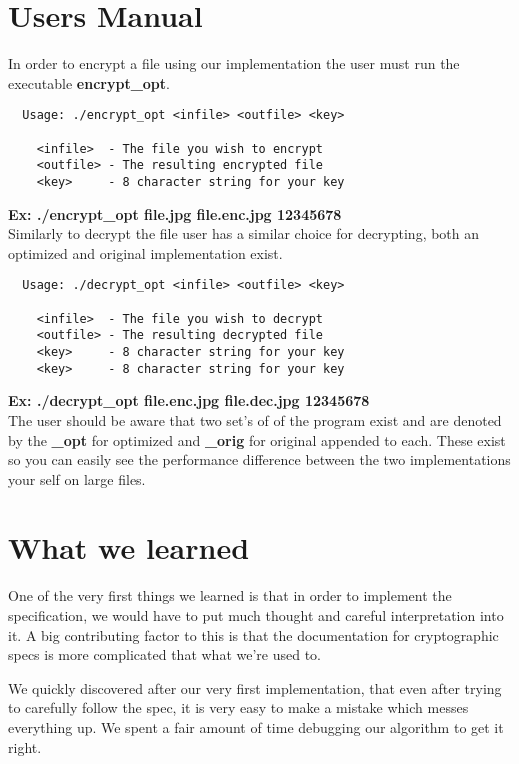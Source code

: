 \documentclass[10pt]{article}
\begin{document}
\section{Users Manual}

\noindent In order to encrypt a file using our implementation the user must run the executable \textbf{encrypt\_opt}.
\begin{verbatim}
  Usage: ./encrypt_opt <infile> <outfile> <key>

    <infile>  - The file you wish to encrypt
    <outfile> - The resulting encrypted file
    <key>     - 8 character string for your key
\end{verbatim}

\noindent \textbf{Ex: ./encrypt\_opt file.jpg file.enc.jpg 12345678} \\

\noindent Similarly to decrypt the file  user has a similar choice for decrypting, both an optimized and original implementation exist.
\begin{verbatim}
  Usage: ./decrypt_opt <infile> <outfile> <key>

    <infile>  - The file you wish to decrypt
    <outfile> - The resulting decrypted file
    <key>     - 8 character string for your key
    <key>     - 8 character string for your key
\end{verbatim}

\noindent \textbf{Ex: ./decrypt\_opt file.enc.jpg file.dec.jpg 12345678} \\

The user should be aware that two set's of of the program exist and are denoted by the \textbf{\_opt} for optimized and \textbf{\_orig} for original appended to each.
These exist so you can easily see the performance difference between the two implementations your self on large files.

\section{What we learned}
One of the very first things we learned is that in order to implement the specification, we would have to put much thought and careful interpretation into it. A big contributing factor to this is that the documentation for cryptographic specs is more complicated that what we're used to.

We quickly discovered after our very first implementation, that even after trying to carefully follow the spec, it is very easy to make a mistake which messes everything up.  We spent a fair amount of time debugging our algorithm to get it right.
\end{document}
